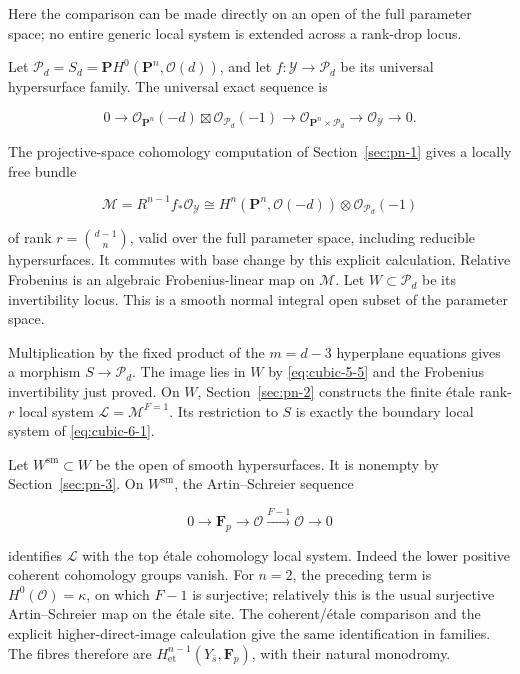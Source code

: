 \documentclass[11pt]{article}
\begin{document}
Here the comparison can be made directly on an open of the full parameter space; no entire generic local system is extended across a rank-drop locus.

Let \(\mathcal P_d=S_d=\mathbf P H^0(\mathbf P^n,\mathcal O(d))\), and let \(f:\mathcal Y\to\mathcal P_d\) be its universal hypersurface family. The universal exact sequence is

\[
0\to\mathcal O_{\mathbf P^n}(-d)\boxtimes
                 \mathcal O_{\mathcal P_d}(-1)
\to\mathcal O_{\mathbf P^n\times\mathcal P_d}
\to\mathcal O_{\mathcal Y}\to0.
\]

The projective-space cohomology computation of Section~\ref{sec:pn-1} gives a locally free bundle

\[
\mathcal M=R^{n-1}f_*\mathcal O_{\mathcal Y}
\cong H^n(\mathbf P^n,\mathcal O(-d))
             \otimes\mathcal O_{\mathcal P_d}(-1)
\]

of rank \(r=\binom{d-1}n\), valid over the full parameter space, including reducible hypersurfaces. It commutes with base change by this explicit calculation. Relative Frobenius is an algebraic Frobenius-linear map on \(\mathcal M\). Let \(W\subset\mathcal P_d\) be its invertibility locus. This is a smooth normal integral open subset of the parameter space.

Multiplication by the fixed product of the \(m=d-3\) hyperplane equations gives a morphism \(S\to\mathcal P_d\). The image lies in \(W\) by \eqref{eq:cubic-5-5} and the Frobenius invertibility just proved. On \(W\), Section~\ref{sec:pn-2} constructs the finite étale rank-\(r\) local system \(\mathcal L=\mathcal M^{F=1}\). Its restriction to \(S\) is exactly the boundary local system of \eqref{eq:cubic-6-1}.

Let \(W^{\mathrm{sm}}\subset W\) be the open of smooth hypersurfaces. It is nonempty by Section~\ref{sec:pn-3}. On \(W^{\mathrm{sm}}\), the Artin--Schreier sequence

\[
0\to\mathbf F_p\to\mathcal O\xrightarrow{F-1}\mathcal O\to0
\]

identifies \(\mathcal L\) with the top étale cohomology local system. Indeed the lower positive coherent cohomology groups vanish. For \(n=2\), the preceding term is \(H^0(\mathcal O)=\kappa\), on which \(F-1\) is surjective; relatively this is the usual surjective Artin--Schreier map on the étale site. The coherent/étale comparison and the explicit higher-direct-image calculation give the same identification in families. The fibres therefore are \(H^{n-1}_{\mathrm{et}}(Y_{\bar s},\mathbf F_p)\), with their natural monodromy.
\end{document}
